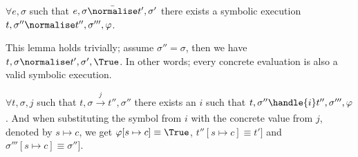 \begin{lemma}
  $\forall e,\sigma$ such that $e,\sigma \bar{\normalise}t',\sigma'$
  there exists a symbolic execution $t,\sigma''\normalise t'',\sigma''',\phi$.
\end{lemma}

This lemma holds trivially; assume $\sigma''=\sigma$, then we have $t,\sigma\normalise t',\sigma',\True$. In other words; every concrete evaluation is also a valid symbolic execution.

\begin{lemma}
  $\forall t,\sigma,j$ such that $t,\sigma \xrightarrow[]{j} t'',\sigma''$
  there exists an $i$ such that $t,\sigma''\handle{i} t'',\sigma''',\phi$. And when substituting the symbol from $i$ with the concrete value from $j$, denoted by $s\mapsto c$, we get $\phi[s\mapsto c]\equiv\True$, $t''[s\mapsto c]\equiv t']$ and $\sigma'''[s\mapsto c]\equiv\sigma'']$.
\end{lemma}

\begin{lemma}
\end{lemma}
